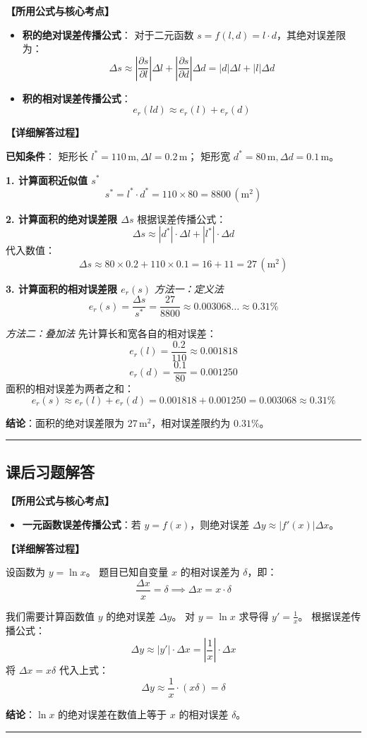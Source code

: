\documentclass[a4paper,12pt]{ctexart}
\newcommand{\solitem}[3]{
    \vspace{1.5em}
    \begin{tcolorbox}[colback=gray!5!white, colframe=gray!50!black, title=\textbf{题目 #1}]
    \end{tcolorbox}
    
    \noindent\textbf{【所用公式与核心考点】}
    \begin{itemize}[leftmargin=2em, label=$\diamond$]
        #2
    \end{itemize}
    
    \noindent\textbf{【详细解答过程】}
    \par
    #3
    \par
    \vspace{1em}
    \hrule
}
\begin{document}
\solitem{[4]}{
    \item \textbf{积的绝对误差传播公式}：
    对于二元函数 $s = f(l, d) = l \cdot d$，其绝对误差限为：
    \[ \Delta s \approx \left| \frac{\partial s}{\partial l} \right| \Delta l + \left| \frac{\partial s}{\partial d} \right| \Delta d = |d|\Delta l + |l|\Delta d \]
    \item \textbf{积的相对误差传播公式}：
    \[ e_r(ld) \approx e_r(l) + e_r(d) \]
}{
    \textbf{已知条件}：
    矩形长 $l^* = 110\,\mathrm{m}, \Delta l = 0.2\,\mathrm{m}$；
    矩形宽 $d^* = 80\,\mathrm{m}, \Delta d = 0.1\,\mathrm{m}$。
  
    \textbf{1. 计算面积近似值 $s^*$}
    \[ s^* = l^* \cdot d^* = 110 \times 80 = 8800 \, (\mathrm{m}^2) \]
  
    \textbf{2. 计算面积的绝对误差限 $\Delta s$}
    根据误差传播公式：
    \[ \Delta s \approx |d^*| \cdot \Delta l + |l^*| \cdot \Delta d \]
    代入数值：
    \[ \Delta s \approx 80 \times 0.2 + 110 \times 0.1 = 16 + 11 = 27 \, (\mathrm{m}^2) \]
  
    \textbf{3. 计算面积的相对误差限 $e_r(s)$}
    \textit{方法一：定义法}
    \[ e_r(s) = \frac{\Delta s}{s^*} = \frac{27}{8800} \approx 0.003068 \dots \approx 0.31\% \]
  
    \textit{方法二：叠加法}
    先计算长和宽各自的相对误差：
    \[ e_r(l) = \frac{0.2}{110} \approx 0.001818 \]
    \[ e_r(d) = \frac{0.1}{80} = 0.001250 \]
    面积的相对误差为两者之和：
    \[ e_r(s) \approx e_r(l) + e_r(d) = 0.001818 + 0.001250 = 0.003068 \approx 0.31\% \]
  
    \textbf{结论}：面积的绝对误差限为 $27\,\mathrm{m}^2$，相对误差限约为 $0.31\%$。
}

\subsection*{课后习题解答}

\solitem{1}{
    \item \textbf{一元函数误差传播公式}：若 $y = f(x)$，则绝对误差 $\Delta y \approx |f'(x)| \Delta x$。
}{
    设函数为 $y = \ln x$。
    题目已知自变量 $x$ 的相对误差为 $\delta$，即：
    \[ \frac{\Delta x}{x} = \delta \implies \Delta x = x \cdot \delta \]
  
    我们需要计算函数值 $y$ 的绝对误差 $\Delta y$。
    对 $y = \ln x$ 求导得 $y' = \frac{1}{x}$。
    根据误差传播公式：
    \[ \Delta y \approx |y'| \cdot \Delta x = \left| \frac{1}{x} \right| \cdot \Delta x \]
    将 $\Delta x = x \delta$ 代入上式：
    \[ \Delta y \approx \frac{1}{x} \cdot (x \delta) = \delta \]
  
    \textbf{结论}：$\ln x$ 的绝对误差在数值上等于 $x$ 的相对误差 $\delta$。
}
\end{document}
